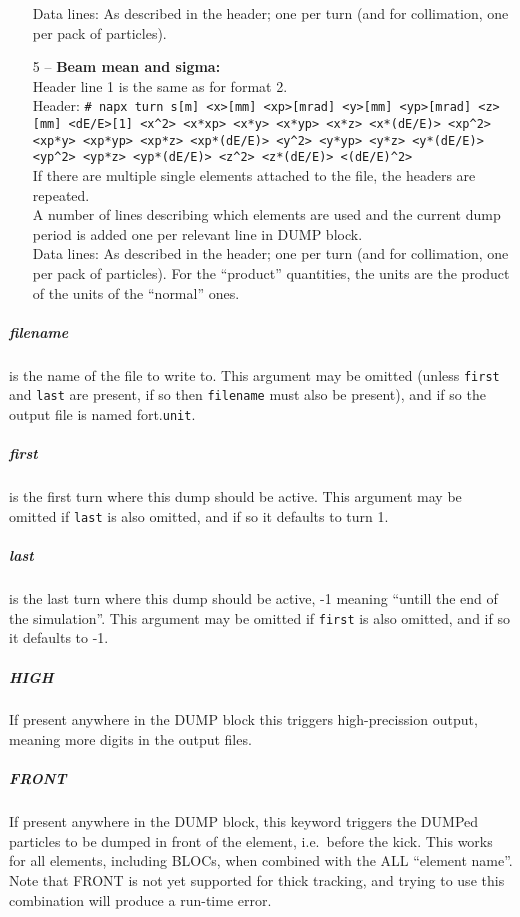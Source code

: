 \documentclass[a4paper,11pt]{report}
\begin{document}
\begin{enumerate}
        Data lines: As described in the header; one per turn (and for collimation, one per pack of particles).
	\item[5] -- \textbf{Beam mean and sigma:}\\
        Header line 1 is the same as for format 2.\\
	Header: \texttt{\# napx turn s[m] <x>[mm] <xp>[mrad] <y>[mm] <yp>[mrad] <z>[mm] <dE/E>[1] <x\^{}2> <x*xp> <x*y> <x*yp> <x*z> <x*(dE/E)> <xp\^{}2> <xp*y> <xp*yp> <xp*z> <xp*(dE/E)> <y\^{}2> <y*yp> <y*z> <y*(dE/E)> <yp\^{}2> <yp*z> <yp*(dE/E)> <z\^{}2> <z*(dE/E)> <(dE/E)\^{}2>}\\
        If there are multiple single elements attached to the file, the headers are repeated.\\
	A number of lines describing which elements are used and the current dump period is added one per relevant line in DUMP block.\\
	Data lines: As described in the header; one per turn (and for collimation, one per pack of particles).
        For the ``product'' quantities, the units are the product of the units of the ``normal'' ones.
\end{enumerate}

\subparagraph{filename} is the name of the file to write to. This argument may be omitted (unless \texttt{first} and \texttt{last} are present, if so then \texttt{filename} must also be present), and if so the output file is named fort.\texttt{unit}.

\subparagraph{first} is the first turn where this dump should be active. This argument may be omitted if \texttt{last} is also omitted, and if so it defaults to turn 1.

\subparagraph{last} is the last turn where this dump should be active, -1 meaning ``untill the end of the simulation''. This argument may be omitted if \texttt{first} is also omitted, and if so it defaults to -1.

\subparagraph{HIGH} If present anywhere in the DUMP block this triggers high-precission output, meaning more digits in the output files.

\subparagraph{FRONT} If present anywhere in the DUMP block, this keyword triggers the DUMPed particles to be dumped in front of the element, i.e.\ before the kick.
This works for all elements, including BLOCs, when combined with the ALL ``element name''.
Note that FRONT is not yet supported for thick tracking, and trying to use this combination will produce a run-time error.
\end{document}
